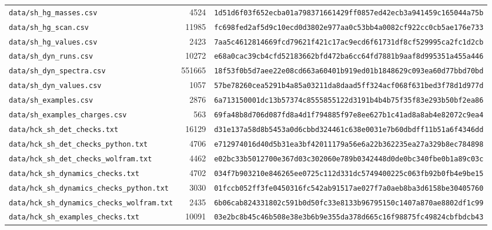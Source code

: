 \documentclass[aps,prd,onecolumn,superscriptaddress,nofootinbib,floatfix,longbibliography]{revtex4-2}
\begin{document}
\begin{longtable}{lrl}
\texttt{data/sh\_hg\_masses.csv} & 4524 & \texttt{\scriptsize 1d51d6f03f652ecba01a798371661429ff0857ed42ecb3a941459c165044a75b} \\
\texttt{data/sh\_hg\_scan.csv} & 11985 & \texttt{\scriptsize fc698fed2af5d9c10ecd0d3802e977aa0c53bb4a0082cf922cc0cb5ae176e733} \\
\texttt{data/sh\_hg\_values.csv} & 2423 & \texttt{\scriptsize 7aa5c4612814669fcd79621f421c17ac9ecd6f61731df8cf529995ca2fc1d2cb} \\
\texttt{data/sh\_dyn\_runs.csv} & 10272 & \texttt{\scriptsize e68a0cac39cb4cfd52183662bfd472ba6cc64fd7881b9aaf8d995351a455a446} \\
\texttt{data/sh\_dyn\_spectra.csv} & 551665 & \texttt{\scriptsize 18f53f0b5d7aee22e08cd663a60401b919ed01b1848629c093ea60d77bbd70bd} \\
\texttt{data/sh\_dyn\_values.csv} & 1057 & \texttt{\scriptsize 57be78260cea5291b4a85a03211da8daad5ff324acf068f631bed3f78d1d977d} \\
\texttt{data/sh\_examples.csv} & 2876 & \texttt{\scriptsize 6a713150001dc13b57374c8555855122d3191b4b4b75f35f83e293b50bf2ea86} \\
\texttt{data/sh\_examples\_charges.csv} & 563 & \texttt{\scriptsize 69fa48b8d706d087fd8a4d1f794885f97e8ee627b1c41ad8a8ab4e82072c9ea4} \\
\texttt{data/hck\_sh\_det\_checks.txt} & 16129 & \texttt{\scriptsize d31e137a58d8b5453a0d6cbbd324461c638e0031e7b60dbdff11b51a6f4346dd} \\
\texttt{data/hck\_sh\_det\_checks\_python.txt} & 4706 & \texttt{\scriptsize e712974016d40d5b31ea3bf42011179a56e6a22b362235ea27a329b8ec784898} \\
\texttt{data/hck\_sh\_det\_checks\_wolfram.txt} & 4462 & \texttt{\scriptsize e02bc33b5012700e367d03c302060e789b0342448d0de0bc340fbe0b1a89c03c} \\
\texttt{data/hck\_sh\_dynamics\_checks.txt} & 4702 & \texttt{\scriptsize 034f7b903210e846265ee0725c112d331dc5749400225c063fb92b0fb4e9be15} \\
\texttt{data/hck\_sh\_dynamics\_checks\_python.txt} & 3030 & \texttt{\scriptsize 01fccb052ff3fe0450316fc542ab91517ae027f7a0aeb8ba3d6158be30405760} \\
\texttt{data/hck\_sh\_dynamics\_checks\_wolfram.txt} & 2435 & \texttt{\scriptsize 6b06cab824331802c591b0d50fc33e8133b96795150c1407a870ae8802df1c99} \\
\texttt{data/hck\_sh\_examples\_checks.txt} & 10091 & \texttt{\scriptsize 03e2bc8b45c46b508e38e3b6b9e355da378d665c16f98875fc49824cbfbdcb43} \\

\end{longtable}
\end{document}
